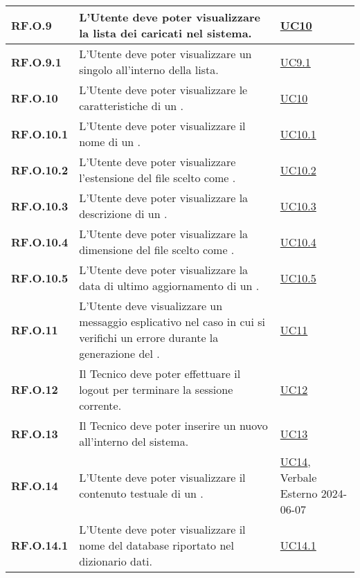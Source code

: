\begin{longtable}{|P{3cm}|P{6,5cm}|>{\arraybackslash}P{4cm}|}
    \hline
    \textbf{RF.O.9} & L'Utente deve poter visualizzare la lista dei  caricati nel sistema. & \hyperref[UC10]{UC10}\\
    \hline
    \textbf{RF.O.9.1} & L'Utente deve poter visualizzare un singolo  all'interno della lista. & \hyperref[UC9point1]{UC9.1}\\
    \hline
    \textbf{RF.O.10} & L'Utente deve poter visualizzare le caratteristiche di un . & \hyperref[UC10]{UC10}\\
    \hline
    \textbf{RF.O.10.1} & L'Utente deve poter visualizzare il nome di un . & \hyperref[UC10point1]{UC10.1}\\
    \hline
    \textbf{RF.O.10.2} & L'Utente deve poter visualizzare l'estensione del file scelto come . & \hyperref[UC10point2]{UC10.2}\\
    \hline
    \textbf{RF.O.10.3} & L'Utente deve poter visualizzare la descrizione di un . & \hyperref[UC10point3]{UC10.3}\\
    \hline
    \textbf{RF.O.10.4} & L'Utente deve poter visualizzare la dimensione del file scelto come . & \hyperref[UC10point4]{UC10.4}\\
    \hline
    \textbf{RF.O.10.5} & L'Utente deve poter visualizzare la data di ultimo aggiornamento di un . & \hyperref[UC10point5]{UC10.5}\\
    \hline
    \textbf{RF.O.11} & L'Utente deve visualizzare un messaggio esplicativo nel caso in cui si verifichi un errore durante la generazione del . & \hyperref[UC11]{UC11}\\
    \hline
    \textbf{RF.O.12} & Il Tecnico deve poter effettuare il logout per terminare la sessione corrente. & \hyperref[UC12]{UC12}\\
    \hline
    \textbf{RF.O.13} & Il Tecnico deve poter inserire un nuovo  all'interno del sistema. & \hyperref[UC13]{UC13}\\
    \hline
    \textbf{RF.O.14} & L'Utente deve poter visualizzare il contenuto testuale di un . & \hyperref[UC14]{UC14}, Verbale Esterno 2024-06-07\\
    \hline
    \textbf{RF.O.14.1} & L'Utente deve poter visualizzare il nome del database riportato nel dizionario dati. & \hyperref[UC14point1]{UC14.1}\\

\end{longtable}
